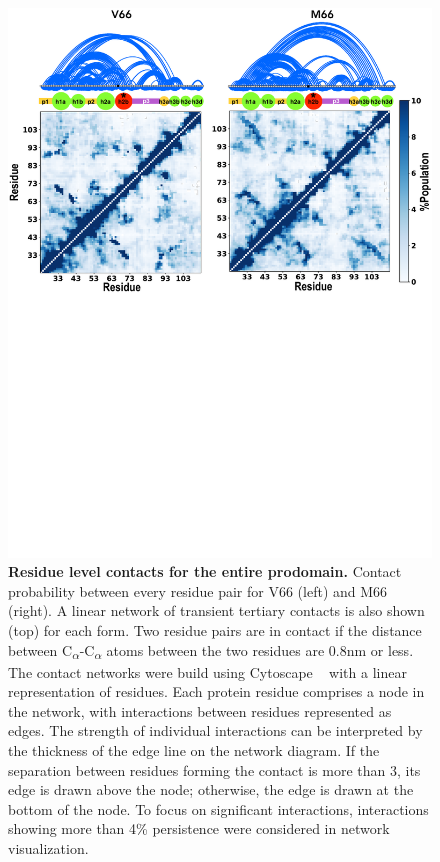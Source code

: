 \documentclass[journal=jacsat,manuscript=article]{achemso}
\begin{document}
 \begin{figure}[!ht]
\includegraphics[scale=0.5,width=\textwidth,trim={0 0cm 0 0cm},clip]{../figures/S5.pdf}
\caption{{\bf Residue level contacts for the entire prodomain.} Contact probability between every residue pair for V66 (left) and M66 (right). A linear network of transient tertiary contacts is also shown (top) for each form. Two residue pairs are in contact if the distance between C\textsubscript{$\alpha$}-C\textsubscript{$\alpha$} atoms between the two residues are 0.8nm or less. The contact networks were build using Cytoscape ~\cite {Ahlstrom2013} with a linear representation of residues. Each protein residue comprises a node in the network, with interactions between residues represented as edges. The strength of individual interactions can be interpreted by the thickness of the edge line on the network diagram. If the separation between residues forming the contact is more than 3, its edge is drawn above the node; otherwise, the edge is drawn at the bottom of the node. To focus on significant interactions, interactions showing more than 4\% persistence were considered in network visualization.}
\label{S5} 
\end{figure}
\end{document}
